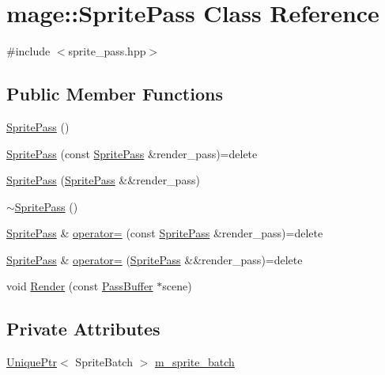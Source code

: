 \hypertarget{classmage_1_1_sprite_pass}{}\section{mage\+:\+:Sprite\+Pass Class Reference}
\label{classmage_1_1_sprite_pass}


{\ttfamily \#include $<$sprite\+\_\+pass.\+hpp$>$}

\subsection*{Public Member Functions}
\begin{DoxyCompactItemize}
\item 
\hyperlink{classmage_1_1_sprite_pass_abe484eb7c99dabc585d874029c85013f}{Sprite\+Pass} ()
\item 
\hyperlink{classmage_1_1_sprite_pass_ac24c782ce252cbbe179aab2277507a87}{Sprite\+Pass} (const \hyperlink{classmage_1_1_sprite_pass}{Sprite\+Pass} \&render\+\_\+pass)=delete
\item 
\hyperlink{classmage_1_1_sprite_pass_a2af9ccc7970eeff94293638d0cd26d16}{Sprite\+Pass} (\hyperlink{classmage_1_1_sprite_pass}{Sprite\+Pass} \&\&render\+\_\+pass)
\item 
\hyperlink{classmage_1_1_sprite_pass_a70a866324750c21196d80364e9a0e309}{$\sim$\+Sprite\+Pass} ()
\item 
\hyperlink{classmage_1_1_sprite_pass}{Sprite\+Pass} \& \hyperlink{classmage_1_1_sprite_pass_afa43bb0a8588e9196180aa686d81cacc}{operator=} (const \hyperlink{classmage_1_1_sprite_pass}{Sprite\+Pass} \&render\+\_\+pass)=delete
\item 
\hyperlink{classmage_1_1_sprite_pass}{Sprite\+Pass} \& \hyperlink{classmage_1_1_sprite_pass_aed8cc2bcb9ded1cb96c9d65bb7034c0a}{operator=} (\hyperlink{classmage_1_1_sprite_pass}{Sprite\+Pass} \&\&render\+\_\+pass)=delete
\item 
void \hyperlink{classmage_1_1_sprite_pass_ad617d46a3edbf5ee533f4d20e3d69ae2}{Render} (const \hyperlink{structmage_1_1_pass_buffer}{Pass\+Buffer} $\ast$scene)
\end{DoxyCompactItemize}
\subsection*{Private Attributes}
\begin{DoxyCompactItemize}
\item 
\hyperlink{namespacemage_a3316d7143a973e37adf1110f2e80ca31}{Unique\+Ptr}$<$ Sprite\+Batch $>$ \hyperlink{classmage_1_1_sprite_pass_a9083152ae0681429df4dd0fce533f7dc}{m\+\_\+sprite\+\_\+batch}
\end{DoxyCompactItemize}


